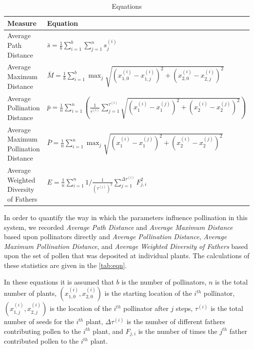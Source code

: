 \begin{table}[h]
\setlength{\extrarowheight}{1em}
{\tiny
\begin{tabular}{|l|l|}
  \hline
  Measure & Equation \\[8pt] \hline   \hline
  Average Path Distance & $\bar{s} = \frac{1}{b} \sum_{i=1}^b \sum_{j=1}^n s^{\left(i\right)}_j$ \\[8pt] \hline
  Average Maximum Distance & $ \bar{M} = \frac{1}{b} \sum_{i=1}^b \max_j \sqrt{\left(x^{\left(i\right)}_{1,0}
- x^{\left(i\right)}_{1,j}\right)^2 +
      \left(x^{\left(i\right)}_{2,0} -
x^{\left(i\right)}_{2,j}\right)^2}  $ \\[8pt] \hline
  Average Pollination Distance & $ \bar{p} = \frac{1}{n} \sum_{i=1}^{n} \left(
\frac{1}{\tau^{\left(i\right)}} \sum_{j=1}^{\tau^{\left(i\right)}}
\sqrt{\left(x^{\left(i\right)}_1 -
x^{\left(j\right)}_1\right)^2 + \left(x^{\left(i\right)}_2 -
    x^{\left(j\right)}_2\right)^2}
    \right)  $ \\[12pt]  \hline
  Average Maximum Pollination Distance & $ \bar{P} = \frac{1}{n} \sum_{i=1}^{n} \max_j \sqrt{\left(x^{\left(i\right)}_1 -
x^{\left(j\right)}_1\right)^2 + \left(x^{\left(i\right)}_2 -
    x^{\left(j\right)}_2\right)^2}$ \\[8pt]  \hline
  Average Weighted Diversity of Fathers & $ E = \frac{1}{n} \sum_{i=1}^n 1/\frac{1}{\left(\tau^{\left(i\right)}\right)^2}
  \sum_{j=1}^{\Delta\tau^{\left(i\right)}} F^2_{j,i} $ \\[8pt]
  \hline
\end{tabular}
}
\caption{Equations}
\label{tab:eqn}
\end{table}

In order to quantify the way in which the parameters influence pollination in
this system, we recorded \emph{Average Path Distance} and \emph{Average Maximum
Distance} based upon pollinators directly and \emph{Average Pollination
Distance}, \emph{Average Maximum Pollination Distance}, and \emph{Average
Weighted Diversity of Fathers} based upon the set of pollen that was deposited
at individual plants.  The calculations of these statistics are given in the
\autoref{tab:eqn}.

In these equations it is assumed that $b$ is the number of pollinators, $n$ is
the total number of plants, $(x_{1,0}^{(i)},x_{2,0}^{(i)})$ is the starting
location of the $i^{th}$ pollinator, $(x_{1,j}^{(i)},x_{2,j}^{(i)})$ is the
location of the $i^{th}$ pollinator after $j$ steps, $\tau^{(i)}$ is the total
number of seeds for the $i^{th}$ plant, $\Delta\tau^{(i)}$ is the number of
different fathers contributing pollen to the $i^{th}$ plant, and $F_{j,i}$ is
the number of times the $j^{th}$ father contributed pollen to the $i^{th}$
plant.
